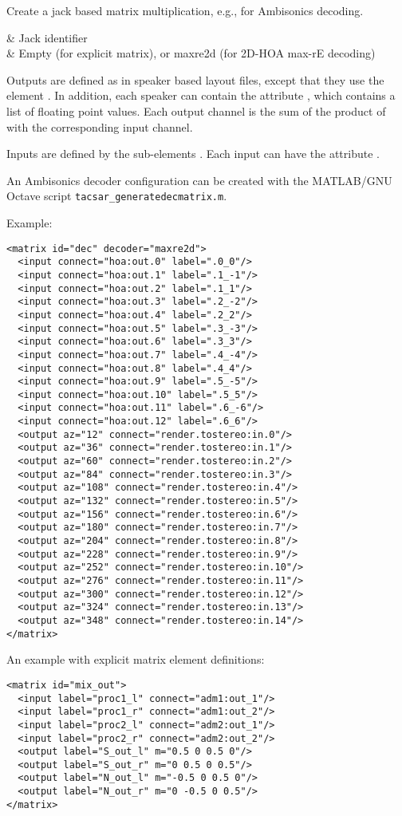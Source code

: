 Create a jack based matrix multiplication, e.g., for Ambisonics decoding.

\begin{tscattributes}
 & Jack identifier\\
 & Empty (for explicit matrix), or maxre2d (for 2D-HOA max-rE decoding)\\
\end{tscattributes}

Outputs are defined as in speaker based layout files, except that they
use the element .
%
In addition, each speaker can contain the attribute , which
contains a list of floating point values.
%
Each output channel is the sum of the product of  with the
corresponding input channel.

Inputs are defined by the sub-elements .
%
Each input can have the attribute .

An Ambisonics decoder configuration can be created with the MATLAB/GNU
Octave script \verb!tacsar_generatedecmatrix.m!.

Example:
\begin{lstlisting}[numbers=none]
<matrix id="dec" decoder="maxre2d">
  <input connect="hoa:out.0" label=".0_0"/>
  <input connect="hoa:out.1" label=".1_-1"/>
  <input connect="hoa:out.2" label=".1_1"/>
  <input connect="hoa:out.3" label=".2_-2"/>
  <input connect="hoa:out.4" label=".2_2"/>
  <input connect="hoa:out.5" label=".3_-3"/>
  <input connect="hoa:out.6" label=".3_3"/>
  <input connect="hoa:out.7" label=".4_-4"/>
  <input connect="hoa:out.8" label=".4_4"/>
  <input connect="hoa:out.9" label=".5_-5"/>
  <input connect="hoa:out.10" label=".5_5"/>
  <input connect="hoa:out.11" label=".6_-6"/>
  <input connect="hoa:out.12" label=".6_6"/>
  <output az="12" connect="render.tostereo:in.0"/>
  <output az="36" connect="render.tostereo:in.1"/>
  <output az="60" connect="render.tostereo:in.2"/>
  <output az="84" connect="render.tostereo:in.3"/>
  <output az="108" connect="render.tostereo:in.4"/>
  <output az="132" connect="render.tostereo:in.5"/>
  <output az="156" connect="render.tostereo:in.6"/>
  <output az="180" connect="render.tostereo:in.7"/>
  <output az="204" connect="render.tostereo:in.8"/>
  <output az="228" connect="render.tostereo:in.9"/>
  <output az="252" connect="render.tostereo:in.10"/>
  <output az="276" connect="render.tostereo:in.11"/>
  <output az="300" connect="render.tostereo:in.12"/>
  <output az="324" connect="render.tostereo:in.13"/>
  <output az="348" connect="render.tostereo:in.14"/>
</matrix>
\end{lstlisting}

An example with explicit matrix element definitions:
\begin{lstlisting}[numbers=none]
<matrix id="mix_out">
  <input label="proc1_l" connect="adm1:out_1"/>
  <input label="proc1_r" connect="adm1:out_2"/>
  <input label="proc2_l" connect="adm2:out_1"/>
  <input label="proc2_r" connect="adm2:out_2"/>
  <output label="S_out_l" m="0.5 0 0.5 0"/>
  <output label="S_out_r" m="0 0.5 0 0.5"/>
  <output label="N_out_l" m="-0.5 0 0.5 0"/>
  <output label="N_out_r" m="0 -0.5 0 0.5"/>
</matrix>
\end{lstlisting}
